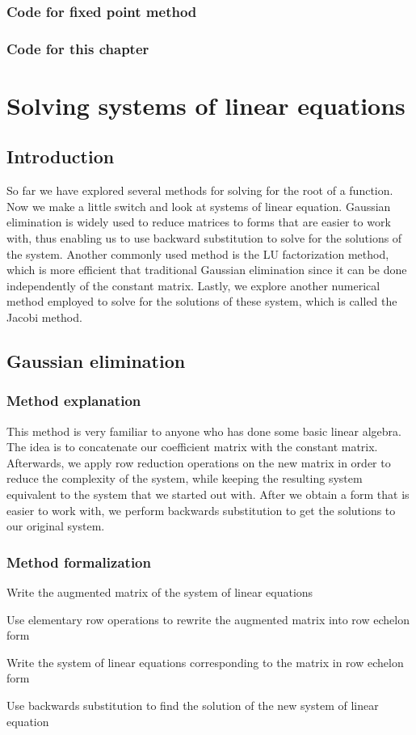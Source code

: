 \documentclass[openany]{book}
\begin{document}
    \subsection{Code for fixed point method}
	
    \subsection{Code for this chapter}
	
    
    \chapter{Solving systems of linear equations}
    \section{Introduction}
    So far we have explored several methods for solving for the root of a function. Now we make a little switch and look at systems of linear equation. Gaussian elimination is widely used to reduce matrices to forms that are easier to work with, thus enabling us to use backward substitution to solve for the solutions of the system. Another commonly used method is the LU factorization method, which is more efficient that traditional Gaussian elimination since it can be done independently of the constant matrix. Lastly, we explore another numerical method employed to solve for the solutions of these system, which is called the Jacobi method.
    \section{Gaussian elimination}
    \subsection{Method explanation}
    This method is very familiar to anyone who has done some basic linear algebra. The idea is to concatenate our coefficient matrix with the constant matrix. Afterwards, we apply row reduction operations on the new matrix in order to reduce the complexity of the system, while keeping the resulting system equivalent to the system that we started out with. After we obtain a form that is easier to work with, we perform backwards substitution to get the solutions to our original system.
    \subsection{Method formalization}
    \begin{steps}
    	\item Write the augmented matrix of the system of linear equations
        \item Use elementary row operations to rewrite the augmented matrix into row echelon form
        \item Write the system of linear equations corresponding to the matrix in row echelon form
        \item Use backwards substitution to find the solution of the new system of linear equation
    \end{steps}
\end{document}
